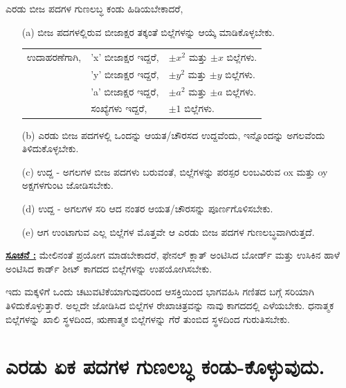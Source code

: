 ಎರಡು ಬೀಜ ಪದಗಳ ಗುಣಲಬ್ಧ ಕಂಡು ಹಿಡಿಯಬೇಕಾದರೆ,
\smallskip
\smallskip
\begin{itemize}
\item [(a)] ಬೀಜ ಪದಗಳಲ್ಲಿರುವ ಬೀಜಾಕ್ಷರ ತಕ್ಕಂತೆ ಬಿಲ್ಲೆಗಳನ್ನು ಆಯ್ಕೆ ಮಾಡಿಕೊಳ್ಳಬೇಕು.

\smallskip

\begin{tabular}{lll}
ಉದಾಹರಣೆಗಾಗಿ, & 'x' ಬೀಜಾಕ್ಷರ ಇದ್ದರೆ, & $\pm x^2$ ಮತ್ತು $\pm x$ ಬಿಲ್ಲೆಗಳು.\\[0.1cm]
& 'y' ಬೀಜಾಕ್ಷರ ಇದ್ದರೆ, & $\pm y^2$ ಮತ್ತು $\pm y$ ಬಿಲ್ಲೆಗಳು.\\[0.1cm]
& 'a' ಬೀಜಾಕ್ಷರ ಇದ್ದರೆ, & $\pm a^2$ ಮತ್ತು $\pm a$ ಬಿಲ್ಲೆಗಳು.\\[0.1cm]
& ಸಂಖ್ಯೆಗಳು ಇದ್ದರೆ, & $\pm 1$ ಬಿಲ್ಲೆಗಳು.  
\end{tabular}

\medskip

\item [(b)] ಎರಡು ಬೀಜ ಪದಗಳಲ್ಲಿ ಒಂದನ್ನು ಆಯತ/ಚೌರಸದ ಉದ್ದವೆಂದು, ಇನ್ನೊಂದನ್ನು ಅಗಲವೆಂದು ತಿಳಿದುಕೊಳ್ಳಬೇಕು. 

\medskip

\item [(c)] ಉದ್ದ - ಅಗಲಗಳ ಬೀಜ ಪದಗಳು ಬರುವಂತೆ, ಬಿಲ್ಲೆಗಳನ್ನು ಪರಸ್ಪರ ಲಂಬವಿರುವ ox ಮತ್ತು oy ಅಕ್ಷಗಳಗುಂಟ ಜೋಡಿಸಬೇಕು. 

\medskip

\item [(d)] ಉದ್ದ - ಅಗಲಗಳ ಸರಿ ಆದ ನಂತರ ಆಯತ/ಚೌರಸನ್ನು ಪೂರ್ಣಗೊಳಿಸಬೇಕು. 

\medskip

\item [(e)] ಆಗ ಉಂಟಾಗುವ ಎಲ್ಲ ಬಿಲ್ಲೆಗಳ ಮೊತ್ತವೇ ಆ ಎರಡು ಬೀಜ ಪದಗಳ ಗುಣಲಬ್ಧ\break ವಾಗಿರುತ್ತದೆ.
\end{itemize}

\medskip
\noindent
{\textbf{\underline{ಸೂಚನೆ :}}} ಮೇಲಿನಂತೆ ಪ್ರಯೋಗ ಮಾಡಬೇಕಾದರೆ, ಫೇನಲ್ ಕ್ಲಾತ್ ಅಂಟಿಸಿದ ಬೋರ್ಡ್ ಮತ್ತು ಉಸಿಕಿನ ಹಾಳೆ ಅಂಟಿಸಿದ ಕಾರ್ಡ್ ಶೀಟ್ ಕಾಗದದ ಬಿಲ್ಲೆಗಳನ್ನು ಉಪಯೋಗಿಸ\-ಬೇಕು. 

\smallskip

ಇದು ಮಕ್ಕಳಿಗೆ ಒಂದು ಚಟುವಟಿಕೆಯಾಗುವುದರಿಂದ ಆಸಕ್ತಿಯಿಂದ ಭಾಗವಹಿಸಿ ಗಣಿತದ ಬಗ್ಗೆ ಸರಿಯಾಗಿ ತಿಳಿದುಕೊಳ್ಳುತ್ತಾರೆ. ಅಲ್ಲದೇ ಜೋಡಿಸಿದ ಬಿಲ್ಲೆಗಳ ರೇಖಾಚಿತ್ರವನ್ನು ನಾವು ಕಾಗದದಲ್ಲಿ ಎಳೆಯಬೇಕು. ಧನಾತ್ಮಕ ಬಿಲ್ಲೆಗಳನ್ನು ಖಾಲಿ ಸ್ಥಳದಿಂದ, ಋಣಾತ್ಮಕ ಬಿಲ್ಲೆಗಳನ್ನು ಗೆರೆ ತುಂಬಿದ ಸ್ಥಳದಿಂದ ಗುರುತಿಸಬೇಕು.

\section*{ಎರಡು ಏಕ ಪದಗಳ ಗುಣಲಬ್ಧ ಕಂಡು-ಕೊಳ್ಳುವುದು.}

